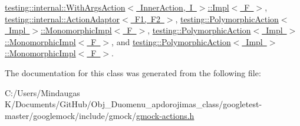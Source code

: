 \mbox{\hyperlink{classtesting_1_1internal_1_1_with_args_action_1_1_impl_a4b01eaaab6fc8dab3cec31991cf79766}{testing\+::internal\+::\+With\+Args\+Action$<$ Inner\+Action, I $>$\+::\+Impl$<$ F $>$}}, \mbox{\hyperlink{classtesting_1_1internal_1_1_action_adaptor_a8d8a47a31f068cf6e0c95b91605d5540}{testing\+::internal\+::\+Action\+Adaptor$<$ F1, F2 $>$}}, \mbox{\hyperlink{classtesting_1_1_polymorphic_action_1_1_monomorphic_impl_af657293ae1ac638802c0fd2486ee5f5b}{testing\+::\+Polymorphic\+Action$<$ Impl $>$\+::\+Monomorphic\+Impl$<$ F $>$}}, \mbox{\hyperlink{classtesting_1_1_polymorphic_action_1_1_monomorphic_impl_ae532b81e7689e0677d64c81f500f3c15}{testing\+::\+Polymorphic\+Action$<$ Impl $>$\+::\+Monomorphic\+Impl$<$ F $>$}}, and \mbox{\hyperlink{classtesting_1_1_polymorphic_action_1_1_monomorphic_impl_ae532b81e7689e0677d64c81f500f3c15}{testing\+::\+Polymorphic\+Action$<$ Impl $>$\+::\+Monomorphic\+Impl$<$ F $>$}}.



The documentation for this class was generated from the following file\+:\begin{DoxyCompactItemize}
\item 
C\+:/\+Users/\+Mindaugas K/\+Documents/\+Git\+Hub/\+Obj\+\_\+\+Duomenu\+\_\+apdorojimas\+\_\+class/googletest-\/master/googlemock/include/gmock/\mbox{\hyperlink{googletest-master_2googlemock_2include_2gmock_2gmock-actions_8h}{gmock-\/actions.\+h}}\end{DoxyCompactItemize}
